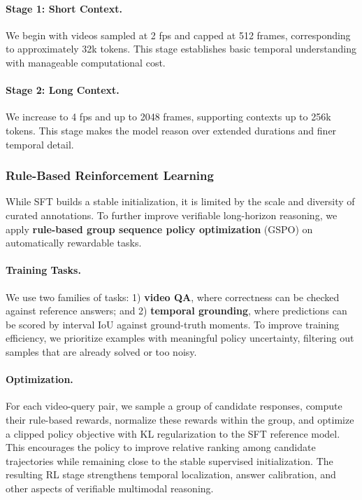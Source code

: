 \documentclass[11pt, letterpaper]{template}
\theoremstyle{plain}
\theoremstyle{definition}
\theoremstyle{remark}
\begin{document}
\paragraph{Stage 1: Short Context.}
We begin with videos sampled at 2 fps and capped at 512 frames, corresponding to approximately 32k tokens. This stage establishes basic temporal understanding with manageable computational cost.

\paragraph{Stage 2: Long Context.}
We increase to 4 fps and up to 2048 frames, supporting contexts up to 256k tokens. This stage makes the model reason over extended durations and finer temporal detail.

\subsubsection{Rule-Based Reinforcement Learning}

While SFT builds a stable initialization, it is limited by the scale and diversity of curated annotations. To further improve verifiable long-horizon reasoning, we apply \textbf{rule-based group sequence policy optimization} (GSPO) on automatically rewardable tasks.

\paragraph{Training Tasks.}
We use two families of tasks: 1) \textbf{video QA}, where correctness can be checked against reference answers; and 2) \textbf{temporal grounding}, where predictions can be scored by interval IoU against ground-truth moments. To improve training efficiency, we prioritize examples with meaningful policy uncertainty, filtering out samples that are already solved or too noisy.

\paragraph{Optimization.}
For each video-query pair, we sample a group of candidate responses, compute their rule-based rewards, normalize these rewards within the group, and optimize a clipped policy objective with KL regularization to the SFT reference model. This encourages the policy to improve relative ranking among candidate trajectories while remaining close to the stable supervised initialization. The resulting RL stage strengthens temporal localization, answer calibration, and other aspects of verifiable multimodal reasoning.
\end{document}

